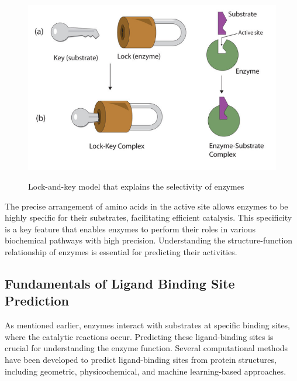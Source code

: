 \begin{figure}[hbt]
    \centering
    \begin{minipage}[t]{.8\textwidth}
    \caption{Lock-and-key model that explains the selectivity of enzymes}
    \includegraphics[width=1\textwidth]{img/key_lock_principle.png}\\
    \label{fig:LockKeyPrinciple}
    \end{minipage}
\end{figure}

The precise arrangement of amino acids in the active site allows enzymes to be highly specific for their substrates, facilitating efficient catalysis. This specificity is a key feature that enables enzymes to perform their roles in various biochemical pathways with high precision. Understanding the structure-function relationship of enzymes is essential for predicting their activities.

\subsection{Fundamentals of Ligand Binding Site Prediction}
\label{sec:Fundamentals of Ligand Binding Site Prediction}

As mentioned earlier, enzymes interact with substrates at specific binding sites, where the catalytic reactions occur. Predicting these ligand-binding sites is crucial for understanding the enzyme function. Several computational methods have been developed to predict ligand-binding sites from protein structures, including geometric, physicochemical, and machine learning-based approaches.

